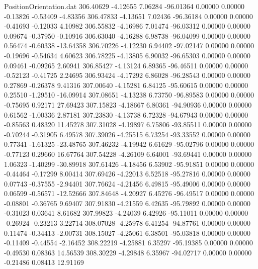 \begin{filecontents}{PositionOrientation.dat}
 306.40629   -4.12655    7.06284   -96.01364    0.00000    0.00000   -0.13826   -0.53409   -4.83356
 306.47833   -4.13651    7.02436   -96.36184    0.00000    0.00000   -0.41693   -0.12033    4.10982
 306.55832   -4.16986    7.01474   -96.03312    0.00000    0.00000    0.09674   -0.37950   -0.10916
 306.63040   -4.16288    6.98738   -96.04099    0.00000    0.00000    0.56474   -0.60338  -13.64358
 306.70226   -4.12230    6.94402   -97.02147    0.00000    0.00000   -0.19696   -0.54634    4.60623
 306.78225   -4.13805    6.90032   -96.65303    0.00000    0.00000    0.09461   -0.09265    2.60941
 306.85427   -4.13124    6.89365   -96.46511    0.00000    0.00000   -0.52123   -0.41725    2.24695
 306.93424   -4.17292    6.86028   -96.28543    0.00000    0.00000    0.27869   -0.26378    9.41316
 307.00640   -4.15281    6.84125   -95.60615    0.00000    0.00000    0.25510   -1.29510  -16.09914
 307.08651   -4.13238    6.73750   -96.89583    0.00000    0.00000   -0.75695    0.92171   27.69423
 307.15823   -4.18667    6.80361   -94.90936    0.00000    0.00000    0.61562   -1.00336    2.87181
 307.23830   -4.13738    6.72328   -94.67943    0.00000    0.00000   -0.85563    0.48320   11.45278
 307.31028   -4.19897    6.75806   -93.85511    0.00000    0.00000   -0.70244   -0.31905    6.49578
 307.39026   -4.25515    6.73254   -93.33552    0.00000    0.00000    0.77341   -1.61325  -23.48765
 307.46232   -4.19942    6.61629   -95.02796    0.00000    0.00000   -0.77123    0.29660   16.67764
 307.54228   -4.26109    6.64001   -93.69441    0.00000    0.00000    1.06323   -1.40299  -30.89918
 307.61426   -4.18456    6.53902   -95.91851    0.00000    0.00000   -0.44464   -0.17299    8.00414
 307.69426   -4.22013    6.52518   -95.27816    0.00000    0.00000    0.07743   -0.37555   -2.94401
 307.76624   -4.21456    6.49815   -95.49006    0.00000    0.00000    0.06599   -0.56571  -12.52666
 307.84648   -4.20927    6.45276   -96.49517    0.00000    0.00000   -0.08801   -0.36765    9.69407
 307.91830   -4.21559    6.42635   -95.79892    0.00000    0.00000   -0.31023    0.03641    8.61682
 307.99823   -4.24039    6.42926   -95.11011    0.00000    0.00000   -0.26924   -0.23213    3.22714
 308.07028   -4.25978    6.41254   -94.87761    0.00000    0.00000    0.11474   -0.34413   -2.00731
 308.15027   -4.25061    6.38501   -95.03818    0.00000    0.00000   -0.11409   -0.44554   -2.16452
 308.22219   -4.25881    6.35297   -95.19385    0.00000    0.00000   -0.49530    0.08363   14.56539
 308.30229   -4.29848    6.35967   -94.02717    0.00000    0.00000   -0.21486    0.08413   12.91169

\end{filecontents}
